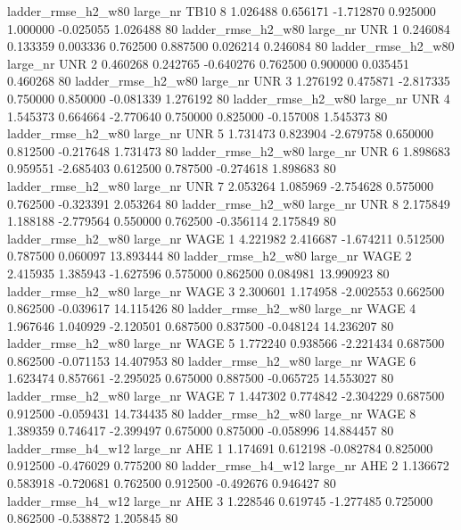  ladder_rmse_h2_w80   large_nr     TB10                 8  1.026488  0.656171  -1.712870 0.925000 1.000000 -0.025055    1.026488 80
 ladder_rmse_h2_w80   large_nr      UNR                 1  0.246084  0.133359   0.003336 0.762500 0.887500  0.026214    0.246084 80
 ladder_rmse_h2_w80   large_nr      UNR                 2  0.460268  0.242765  -0.640276 0.762500 0.900000  0.035451    0.460268 80
 ladder_rmse_h2_w80   large_nr      UNR                 3  1.276192  0.475871  -2.817335 0.750000 0.850000 -0.081339    1.276192 80
 ladder_rmse_h2_w80   large_nr      UNR                 4  1.545373  0.664664  -2.770640 0.750000 0.825000 -0.157008    1.545373 80
 ladder_rmse_h2_w80   large_nr      UNR                 5  1.731473  0.823904  -2.679758 0.650000 0.812500 -0.217648    1.731473 80
 ladder_rmse_h2_w80   large_nr      UNR                 6  1.898683  0.959551  -2.685403 0.612500 0.787500 -0.274618    1.898683 80
 ladder_rmse_h2_w80   large_nr      UNR                 7  2.053264  1.085969  -2.754628 0.575000 0.762500 -0.323391    2.053264 80
 ladder_rmse_h2_w80   large_nr      UNR                 8  2.175849  1.188188  -2.779564 0.550000 0.762500 -0.356114    2.175849 80
 ladder_rmse_h2_w80   large_nr     WAGE                 1  4.221982  2.416687  -1.674211 0.512500 0.787500  0.060097   13.893444 80
 ladder_rmse_h2_w80   large_nr     WAGE                 2  2.415935  1.385943  -1.627596 0.575000 0.862500  0.084981   13.990923 80
 ladder_rmse_h2_w80   large_nr     WAGE                 3  2.300601  1.174958  -2.002553 0.662500 0.862500 -0.039617   14.115426 80
 ladder_rmse_h2_w80   large_nr     WAGE                 4  1.967646  1.040929  -2.120501 0.687500 0.837500 -0.048124   14.236207 80
 ladder_rmse_h2_w80   large_nr     WAGE                 5  1.772240  0.938566  -2.221434 0.687500 0.862500 -0.071153   14.407953 80
 ladder_rmse_h2_w80   large_nr     WAGE                 6  1.623474  0.857661  -2.295025 0.675000 0.887500 -0.065725   14.553027 80
 ladder_rmse_h2_w80   large_nr     WAGE                 7  1.447302  0.774842  -2.304229 0.687500 0.912500 -0.059431   14.734435 80
 ladder_rmse_h2_w80   large_nr     WAGE                 8  1.389359  0.746417  -2.399497 0.675000 0.875000 -0.058996   14.884457 80
 ladder_rmse_h4_w12   large_nr      AHE                 1  1.174691  0.612198  -0.082784 0.825000 0.912500 -0.476029    0.775200 80
 ladder_rmse_h4_w12   large_nr      AHE                 2  1.136672  0.583918  -0.720681 0.762500 0.912500 -0.492676    0.946427 80
 ladder_rmse_h4_w12   large_nr      AHE                 3  1.228546  0.619745  -1.277485 0.725000 0.862500 -0.538872    1.205845 80
